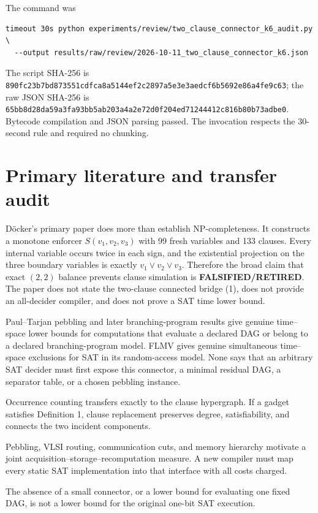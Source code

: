 \documentclass[11pt]{article}
\newcommand{\RETIRED}{\textbf{FALSIFIED/RETIRED}}
\begin{document}
The command was
\begin{verbatim}
timeout 30s python experiments/review/two_clause_connector_k6_audit.py \
  --output results/raw/review/2026-10-11_two_clause_connector_k6.json
\end{verbatim}
The script SHA-256 is
\texttt{890fc23b7bd873551cdfca8a5144ef2c2897a5e3e3aedcf6b5692e86a4fe9c63};
the raw JSON SHA-256 is
\texttt{65bb8d28da59a3fa93bb5ab203a4a2e72d0f204ed71244412c816b80b73adbe0}.
Bytecode compilation and JSON parsing passed.  The invocation respects the
30-second rule and required no chunking.

\section{Primary literature and transfer audit}

D\"ocker's primary paper does more than establish NP-completeness.  It
constructs a monotone enforcer $S(v_1,v_2,v_3)$ with 99 fresh variables and
133 clauses.  Every internal variable occurs twice in each sign, and the
existential projection on the three boundary variables is exactly
$v_1\vee v_2\vee v_3$.  Therefore the broad claim that exact $(2,2)$ balance
prevents clause simulation is \RETIRED.  The paper does not state the
two-clause connected bridge (1), does not provide an all-decider compiler,
and does not prove a SAT time lower bound.

Paul--Tarjan pebbling and later branching-program results give genuine
time--space lower bounds for computations that evaluate a declared DAG or
belong to a declared branching-program model.  FLMV gives genuine
simultaneous time--space exclusions for SAT in its random-access model.
None says that an arbitrary SAT decider must first expose this connector, a
minimal residual DAG, a separator table, or a chosen pebbling instance.

\begin{description}[leftmargin=3.5cm,style=nextline]
\item[THEOREM TRANSFER.]
Occurrence counting transfers exactly to the clause hypergraph.  If a gadget
satisfies Definition 1, clause replacement preserves degree, satisfiability,
and connects the two incident components.
\item[ANALOGY / CANDIDATE.]
Pebbling, VLSI routing, communication cuts, and memory hierarchy motivate a
joint acquisition--storage--recomputation measure.  A new compiler must map
every static SAT implementation into that interface with all costs charged.
\item[FAILED TRANSFER.]
The absence of a small connector, or a lower bound for evaluating one fixed
DAG, is not a lower bound for the original one-bit SAT execution.
\end{description}
\end{document}
